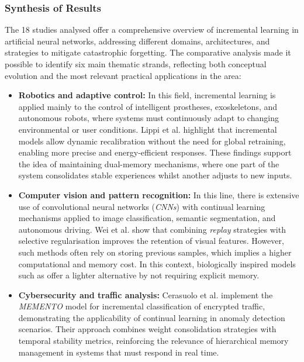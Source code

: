 \subsubsection{Synthesis of Results}

The 18 studies analysed offer a comprehensive overview of incremental learning in artificial neural networks, addressing different domains, architectures, and strategies to mitigate catastrophic forgetting. 
The comparative analysis made it possible to identify six main thematic strands, reflecting both conceptual evolution and the most relevant practical applications in the area:

\begin{itemize}
    \item \textbf{Robotics and adaptive control:}  
    In this field, incremental learning is applied mainly to the control of intelligent prostheses, exoskeletons, and autonomous robots, where systems must continuously adapt to changing environmental or user conditions. 
    Lippi et al. \cite{lippi2021} highlight that incremental models allow dynamic recalibration without the need for global retraining, enabling more precise and energy-efficient responses.  
    These findings support the idea of maintaining dual-memory mechanisms, where one part of the system consolidates stable experiences whilst another adjusts to new inputs.

    \item \textbf{Computer vision and pattern recognition:}  
    In this line, there is extensive use of convolutional neural networks (\textit{CNNs}) with continual learning mechanisms applied to image classification, semantic segmentation, and autonomous driving.  
    Wei et al. \cite{WEI2020} show that combining \textit{replay} strategies with selective regularisation improves the retention of visual features.  
    However, such methods often rely on storing previous samples, which implies a higher computational and memory cost. 
    In this context, biologically inspired models such as \cite{bullinaria2009} offer a lighter alternative by not requiring explicit memory.

    \item \textbf{Cybersecurity and traffic analysis:}  
    Cerasuolo et al. \cite{CERASUOLO2024} implement the \textit{MEMENTO} model for incremental classification of encrypted traffic, demonstrating the applicability of continual learning in anomaly detection scenarios.  
    Their approach combines weight consolidation strategies with temporal stability metrics, reinforcing the relevance of hierarchical memory management in systems that must respond in real time.


\end{itemize}
